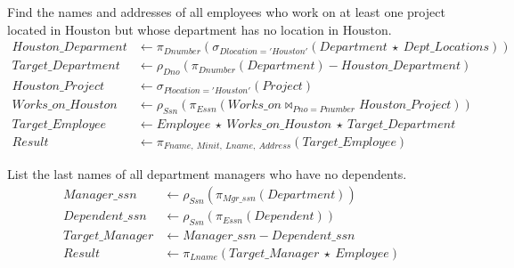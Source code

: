 \documentclass[12pt,letterpaper,titlepage,en-US]{article}
\begin{document}
\begin{homeworkProblem}
Find the names and addresses of all employees who work on at least one project located in Houston but whose department has no location in Houston.
\begin{align*}
    Houston\_Deparment & \leftarrow \pi_{Dnumber}(\sigma_{Dlocation = 'Houston'}(Department\ \star\ Dept\_Locations)) \\
    Target\_Department & \leftarrow \rho_{Dno}(\pi_{Dnumber}(Department) - Houston\_Department) \\
    Houston\_Project & \leftarrow \sigma_{Plocation = 'Houston'}(Project) \\
    Works\_on\_Houston & \leftarrow \rho_{Ssn}(\pi_{Essn}(Works\_on \bowtie_{Pno = Pnumber} Houston\_Project)) \\
    Target\_Employee & \leftarrow Employee\ \star\ Works\_on\_Houston\ \star\ Target\_Department \\
    Result & \leftarrow \pi_{Fname,\ Minit,\ Lname,\ Address}(Target\_Employee)
\end{align*}
\end{homeworkProblem}

\begin{homeworkProblem}
List the last names of all department managers who have no dependents.
\begin{align*}
    Manager\_ssn & \leftarrow \rho_{Ssn}(\pi_{Mgr\_ssn}(Department)) \\
    Dependent\_ssn & \leftarrow \rho_{Ssn}(\pi_{Essn}(Dependent)) \\
    Target\_Manager & \leftarrow Manager\_ssn - Dependent\_ssn \\
    Result & \leftarrow \pi_{Lname}(Target\_Manager\ \star\ Employee) \\
\end{align*}
\end{homeworkProblem}
\end{document}
